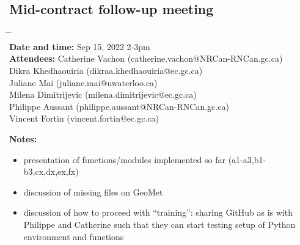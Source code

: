 \documentclass[10pt,a4paper,titlepage,parskip]{scrartcl}
\begin{document}
\subsection{Mid-contract follow-up meeting}
\vspace*{-0.5cm}
\begin{tabbing}
	\hspace{2.8cm} \= \hspace{4cm} \= \kill \\
	\textbf{Date and time:} 	\> Sep 15, 2022 2-3pm\\
	\textbf{Attendees:} 	\> Catherine Vachon \> (catherine.vachon@NRCan-RNCan.gc.ca)\\
	\> Dikra Khedhaouiria \> (dikraa.khedhaouiria@ec.gc.ca)\\
	\> Juliane Mai \> (juliane.mai@uwaterloo.ca)\\
	\> Milena Dimitrijevic \> (milena.dimitrijevic@ec.gc.ca)\\
	\> Philippe Aussant \> (philippe.aussant@NRCan-RNCan.gc.ca)\\
	\> Vincent Fortin \> (vincent.fortin@ec.gc.ca)
\end{tabbing}
\vspace*{-0.5cm}
\textbf{Notes:}
\begin{itemize}
\setlength\itemsep{-0.8em}
\item presentation of functions/modules implemented so far (a1-a3,b1-b3,cx,dx,ex,fx)
\item discussion of missing files on GeoMet
\item discussion of how to proceed with ``training'': sharing GitHub as is with Philippe and Catherine such that they can start testing setup of Python environment and functions
\end{itemize}

%
\pagebreak
\end{document}
